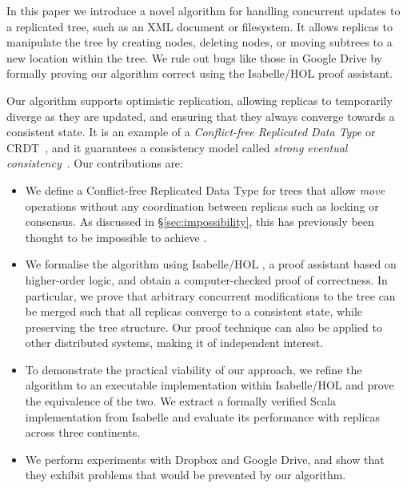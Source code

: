 \documentclass[10pt,journal,compsoc]{IEEEtran}
\begin{document}
In this paper we introduce a novel algorithm for handling concurrent updates to a replicated tree, such as an XML document or filesystem.
It allows replicas to manipulate the tree by creating nodes, deleting nodes, or moving subtrees to a new location within the tree.
We rule out bugs like those in Google Drive by formally proving our algorithm correct using the Isabelle/HOL proof assistant.

Our algorithm supports optimistic replication, allowing replicas to temporarily diverge as they are updated, and ensuring that they always converge towards a consistent state.
It is an example of a \emph{Conflict-free Replicated Data Type} or CRDT~\cite{Shapiro:2011un}, and it guarantees a consistency model called \emph{strong eventual consistency}~\cite{Shapiro:2011un,Gomes:2017gy}.
Our contributions are:
\begin{itemize}
    \item We define a Conflict-free Replicated Data Type for trees that allow \emph{move} operations without any coordination between replicas such as locking or consensus.
        As discussed in \S\ref{sec:impossibility}, this has previously been thought to be impossible to achieve \cite{Najafzadeh:2017vk,Najafzadeh:2018bw}.
    \item We formalise the algorithm using Isabelle/HOL \cite{DBLP:conf/tphol/WenzelPN08}, a proof assistant based on higher-order logic, and obtain a computer-checked proof of correctness.
        In particular, we prove that arbitrary concurrent modifications to the tree can be merged such that all replicas converge to a consistent state, while preserving the tree structure.
        Our proof technique can also be applied to other distributed systems, making it of independent interest.
    \item To demonstrate the practical viability of our approach, we refine the algorithm to an executable implementation within Isabelle/HOL and prove the equivalence of the two.
        We extract a formally verified Scala implementation from Isabelle and evaluate its performance with replicas across three continents.
    \item We perform experiments with Dropbox and Google Drive, and show that they exhibit problems that would be prevented by our algorithm.
\end{itemize}
\end{document}
